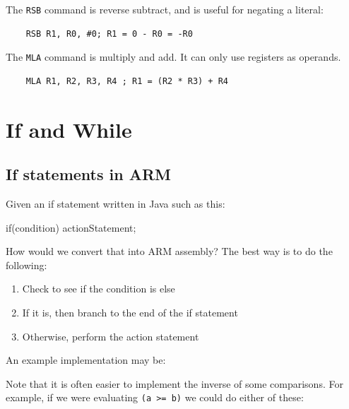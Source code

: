 The {\tt RSB} command is reverse subtract, and is useful for negating a literal:

\begin{verbatim}
	RSB	R1, R0, #0; R1 = 0 - R0 = -R0
\end{verbatim}

The {\tt MLA} command is multiply and add. It can only use registers as
operands.

\begin{verbatim}
	MLA	R1, R2, R3, R4 ; R1 = (R2 * R3) + R4
\end{verbatim}

\section{If and While}

\subsection{If statements in ARM}

Given an if statement written in Java such as this:

\begin{listing}{1}
if(condition)
{
    actionStatement;
}
\end{listing}

How would we convert that into ARM assembly? The best way is to do the
following:

\begin{enumerate}

	\item Check to see if the condition is else

	\item If it is, then branch to the end of the if statement

	\item Otherwise, perform the action statement

\end{enumerate}

An example implementation may be:


Note that it is often easier to implement the inverse of some comparisons. For
example, if we were evaluating {\tt (a >= b)} we could do either of these:

